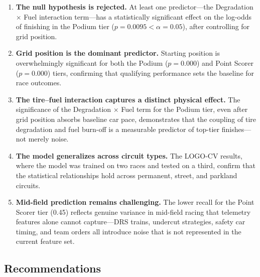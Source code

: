 \begin{enumerate}
  \item \textbf{The null hypothesis is rejected.} At least one predictor---the
    Degradation $\times$ Fuel interaction term---has a statistically
    significant effect on the log-odds of finishing in the Podium tier
    ($p = 0.0095 < \alpha = 0.05$), after controlling for grid position.

  \item \textbf{Grid position is the dominant predictor.} Starting position
    is overwhelmingly significant for both the Podium ($p = 0.000$) and
    Point Scorer ($p = 0.000$) tiers, confirming that qualifying performance
    sets the baseline for race outcomes.

  \item \textbf{The tire--fuel interaction captures a distinct physical
    effect.} The significance of the Degradation $\times$ Fuel term for the
    Podium tier, even after grid position absorbs baseline car pace,
    demonstrates that the coupling of tire degradation and fuel burn-off is
    a measurable predictor of top-tier finishes---not merely noise.

  \item \textbf{The model generalizes across circuit types.} The LOGO-CV
    results, where the model was trained on two races and tested on a
    third, confirm that the statistical relationships hold across permanent,
    street, and parkland circuits.

  \item \textbf{Mid-field prediction remains challenging.} The lower recall
    for the Point Scorer tier (0.45) reflects genuine variance in mid-field
    racing that telemetry features alone cannot capture---DRS trains,
    undercut strategies, safety car timing, and team orders all introduce
    noise that is not represented in the current feature set.
\end{enumerate}

\subsection{Recommendations}

